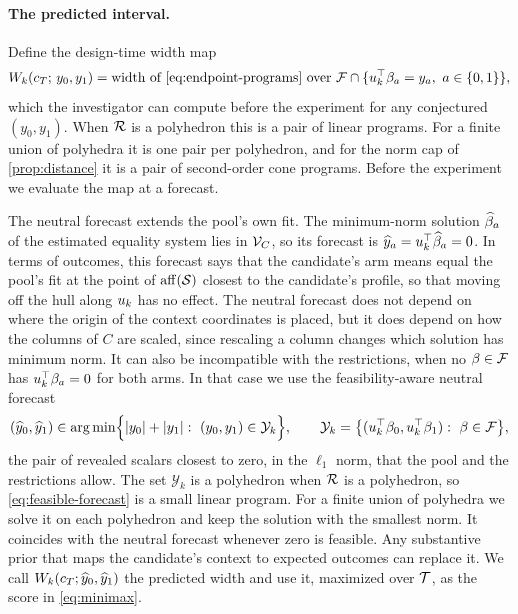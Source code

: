 \paragraph{The predicted interval.}
Define the design-time width map
\begin{equation}
  W_k(c_T;\,y_0,y_1)
  =\text{width of \eqref{eq:endpoint-programs} over }
  \mathcal F\cap\{u_{k}^\top\beta_a=y_a,\ a\in\{0,1\}\},
  \label{eq:width-map}
\end{equation}
which the investigator can compute before the experiment for any
conjectured $(y_0,y_1)$. When $\mathcal R$ is a polyhedron this is a pair
of linear programs. For a finite union of polyhedra it is one pair per
polyhedron, and for the norm cap of \cref{prop:distance} it is a pair of
second-order cone programs. Before the experiment we evaluate the map at
a forecast.

The neutral forecast extends the pool's own fit. The minimum-norm
solution $\widehat{\beta}_a$ of the estimated equality system lies in
$\mathcal V_C$, so its forecast is
$\widehat{y}_a=u_{k}^\top\widehat{\beta}_a=0$. In terms of outcomes, this
forecast says that the candidate's arm means equal the pool's fit at the
point of $\operatorname{aff}(\mathcal S)$ closest to the candidate's profile, so that
moving off the hull along $u_{k}$ has no effect. The neutral forecast does not depend on where the origin of
the context coordinates is placed, but it does depend on how the columns
of $C$ are scaled, since rescaling a column changes which solution has
minimum norm. It can also be incompatible with the restrictions, when no
$\beta\in\mathcal F$ has $u_{k}^\top\beta_a=0$ for both arms. In
that case we use the feasibility-aware neutral forecast
\begin{equation}
  (\widehat{y}_0,\widehat{y}_1)
  \in\arg\min\Bigl\{|y_0|+|y_1|:\
  (y_0,y_1)\in\mathcal Y_k\Bigr\},
  \qquad
  \mathcal Y_k=\bigl\{(u_{k}^\top\beta_0,u_{k}^\top\beta_1):\
  \beta\in\mathcal F\bigr\},
  \label{eq:feasible-forecast}
\end{equation}
the pair of revealed scalars closest to zero, in the $\ell_1$ norm, that
the pool and the restrictions allow. The set $\mathcal Y_k$ is a
polyhedron when $\mathcal R$ is a polyhedron, so
\eqref{eq:feasible-forecast} is a small linear program. For a finite
union of polyhedra we solve it on each polyhedron and keep the solution
with the smallest norm. It coincides with the neutral forecast whenever zero
is feasible. Any substantive prior that maps the candidate's context to
expected outcomes can replace it. We call
$W_k(c_T;\widehat{y}_0,\widehat{y}_1)$ the predicted width and use it,
maximized over $\mathcal T$, as the score in \eqref{eq:minimax}.

